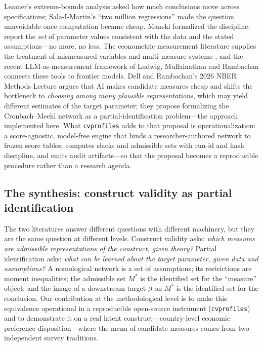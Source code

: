 \documentclass[11pt,letterpaper]{article}
\newcommand{\cvp}{\texttt{cvprofiles}}
\begin{document}
Leamer's extreme-bounds analysis \cite{leamer1983} asked how much conclusions move across specifications; Sala-I-Martin's ``two million regressions'' \cite{sala1997} made the question unavoidable once computation became cheap. Manski \cite{manski2003,manski2007} formalized the discipline: report the \emph{set} of parameter values consistent with the data and the stated assumptions---no more, no less. The econometric measurement literature supplies the treatment of mismeasured variables and multi-measure systems \cite{bound1991,schennach2021}, and the recent LLM-as-measurement framework of Ludwig, Mullainathan and Rambachan \cite{ludwig2026} connects these tools to frontier models. Dell and Rambachan's 2026 NBER Methods Lecture \cite{dell2026} argues that AI makes candidate measures cheap and shifts the bottleneck to \emph{choosing among many plausible representations}, which may yield different estimates of the target parameter; they propose formalizing the Cronbach--Meehl network as a partial-identification problem---the approach implemented here. What \cvp{} adds to that proposal is operationalization: a score-agnostic, model-free engine that binds a researcher-authored network to frozen score tables, computes slacks and admissible sets with run-id and hash discipline, and emits audit artifacts---so that the proposal becomes a reproducible procedure rather than a research agenda.

\subsection{The synthesis: construct validity as partial identification}

The two literatures answer different questions with different machinery, but they are the same question at different levels. Construct validity asks: \emph{which measures are admissible representations of the construct, given theory?} Partial identification asks: \emph{what can be learned about the target parameter, given data and assumptions?} A nomological network is a set of assumptions; its restrictions are moment inequalities; the admissible set $M^*$ is the identified set for the ``measure'' object; and the image of a downstream target $\beta$ on $M^*$ is the identified set for the conclusion. Our contribution at the methodological level is to make this equivalence operational in a reproducible open-source instrument (\cvp{}) and to demonstrate it on a real latent construct---country-level economic preference disposition---where the menu of candidate measures comes from two independent survey traditions.
\end{document}
